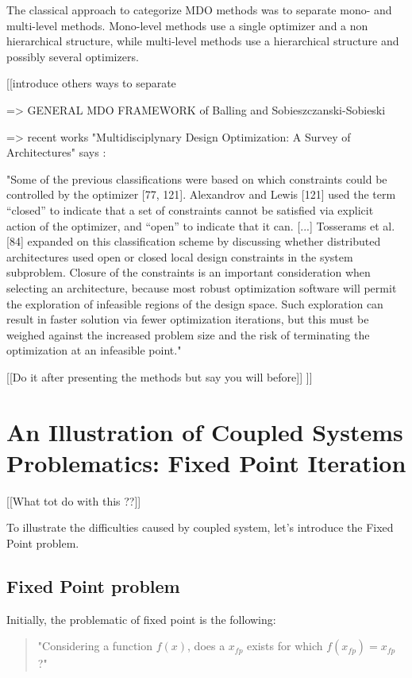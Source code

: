 The classical approach to categorize MDO methods was to separate mono- and multi-level methods.
Mono-level methods use a single optimizer and a non hierarchical structure, while multi-level methods use a hierarchical structure and possibly several optimizers.

[[introduce others ways to separate

=> GENERAL MDO FRAMEWORK of Balling and Sobieszczanski-Sobieski

=> recent works "Multidisciplynary Design Optimization: A Survey of Architectures" says : 

"Some of the previous classifications were based on which constraints could be controlled by the optimizer [77, 121]. Alexandrov and Lewis [121] used the term “closed” to indicate that a set of constraints cannot be satisfied via explicit action of the optimizer, and “open” to indicate that it can.
[...]
Tosserams et al. [84] expanded on this classification
scheme by discussing whether distributed architectures used open or closed local design constraints in the system subproblem. Closure of the constraints is an important consideration when selecting an architecture, because most robust optimization software will permit the exploration of infeasible regions of the design space. Such exploration can result in faster solution via fewer optimization iterations, but this must be weighed against the increased problem size and the risk of terminating the optimization at an infeasible point."


[[Do it after presenting the methods but say you will before]]
]]

\section{An Illustration of Coupled Systems Problematics: Fixed Point Iteration}

[[What tot do with this ??]]

To illustrate the difficulties caused by coupled system, let's introduce the Fixed Point problem.

\subsection{Fixed Point problem}

Initially, the problematic of fixed point is the following:

\begin{quote}"Considering a function $f(x)$, does a $x_{fp}$ exists for which $f(x_{fp}) = x_{fp}$ ?"\end{quote}

